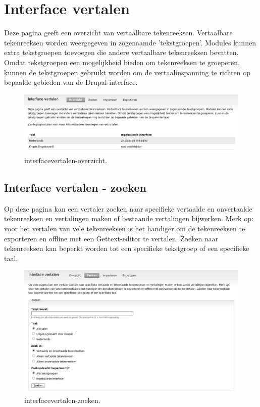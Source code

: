 \section{Interface vertalen} 
Deze pagina geeft een overzicht van vertaalbare tekenreeksen. Vertaalbare tekenreeksen 
worden weergegeven in zogenaamde 'tekstgroepen'. Modules kunnen extra tekstgroepen toevoegen 
die andere vertaalbare tekenreeksen bevatten. Omdat tekstgroepen een mogelijkheid bieden 
om tekenreeksen te groeperen, kunnen de tekstgroepen gebruikt worden om de vertaalinspanning 
te richten op bepaalde gebieden van de Drupal-interface.
\begin{figure}[!h]
    \centering
   \includegraphics[scale=0.3,angle=0]{interfacevertalen-overzicht}
   \caption{interfacevertalen-overzicht.\label{white}}
 \end{figure}

\subsection{Interface vertalen - zoeken}
Op deze pagina kan een vertaler zoeken naar specifieke vertaalde en onvertaalde
tekenreeksen en vertalingen maken of bestaande vertalingen bijwerken. Merk op: 
voor het vertalen van vele tekenreeksen is het handiger om de tekenreeksen te 
exporteren en offline met een Gettext-editor te vertalen. 
Zoeken naar tekenreeksen kan beperkt worden tot een specifieke tekstgroep of een specifieke taal.
\begin{figure}[!h]
    \centering
   \includegraphics[scale=0.3,angle=0]{interfacevertalen-zoeken}
   \caption{interfacevertalen-zoeken.\label{white}}
 \end{figure}
 
